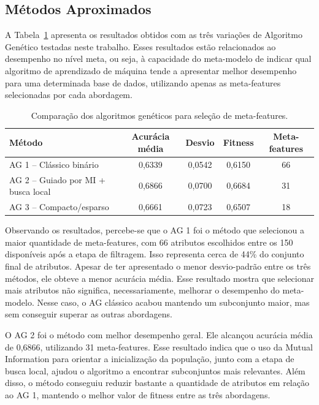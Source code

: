 \documentclass[12pt]{article}
\begin{document}
\subsection{Métodos Aproximados}

A Tabela~\ref{tab} apresenta os resultados obtidos com as três variações de Algoritmo Genético testadas neste trabalho. Esses resultados estão relacionados ao desempenho no nível meta, ou seja, à capacidade do meta-modelo de indicar qual algoritmo de aprendizado de máquina tende a apresentar melhor desempenho para uma determinada base de dados, utilizando apenas as meta-features selecionadas por cada abordagem.

\begin{table}[H]
\centering
\caption{Comparação dos algoritmos genéticos para seleção de meta-features.}
\label{tab}
\begin{tabular}{lcccc}
\hline
\textbf{Método} & \textbf{Acurácia média} & \textbf{Desvio} & \textbf{Fitness} & \textbf{Meta-features} \\
\hline
AG 1 -- Clássico binário & 0,6339 & 0,0542 & 0,6150 & 66 \\
AG 2 -- Guiado por MI + busca local & 0,6866 & 0,0700 & 0,6684 & 31 \\
AG 3 -- Compacto/esparso & 0,6661 & 0,0723 & 0,6507 & 18 \\
\hline
\end{tabular}
\end{table}

Observando os resultados, percebe-se que o AG 1 foi o método que selecionou a maior quantidade de meta-features, com 66 atributos escolhidos entre os 150 disponíveis após a etapa de filtragem. Isso representa cerca de 44\% do conjunto final de atributos. Apesar de ter apresentado o menor desvio-padrão entre os três métodos, ele obteve a menor acurácia média. Esse resultado mostra que selecionar mais atributos não significa, necessariamente, melhorar o desempenho do meta-modelo. Nesse caso, o AG clássico acabou mantendo um subconjunto maior, mas sem conseguir superar as outras abordagens.

O AG 2 foi o método com melhor desempenho geral. Ele alcançou acurácia média de 0,6866, utilizando 31 meta-features. Esse resultado indica que o uso da Mutual Information para orientar a inicialização da população, junto com a etapa de busca local, ajudou o algoritmo a encontrar subconjuntos mais relevantes. Além disso, o método conseguiu reduzir bastante a quantidade de atributos em relação ao AG 1, mantendo o melhor valor de fitness entre as três abordagens.
\end{document}
